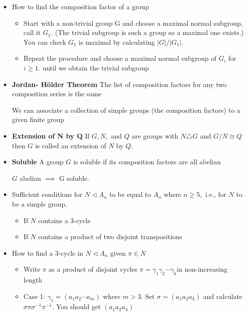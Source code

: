 \documentclass[a4paper, 12pt]
{article}
\begin{document}
\begin{itemize}
	\item How to find the composition factor of a group
	\begin{itemize}
		\item Start with a non-trivial group G and choose a maximal normal subgroup, call it $G_1.$ (The trivial subgroup is such a group so a maximal one exists.) You can check $G_1$ is maximal by calculating $|G|/|G_1|.$ 
		\item Repeat the procedure and choose a maximal normal subgroup of $G_i$ for $i \geq 1.$ until we obtain the trivial subgroup
	
	\end{itemize}
	
	\item \textbf{Jordan- Hölder Theorem}
	The list of composition factors for any two composition series is the same
	
	We can associate a collection of simple groups (the composition factors) to a given finite group
	
	\item \textbf{Extension of N by Q} If $G, N,$ and $Q$ are groups with $N \triangle G$ and $G/N \cong Q$ then $G$ is called an extension of $N$ by $Q.$ 

	
	\item \textbf{Soluble} A group $G$ is soluble if its composition factors are all abelian
	
	$G$ abelian $\implies$ G soluble.
	
	\item Sufficient conditions for $N \triangleleft A_n$ to be equal to $A_n$ where $n \geq 5,$ i.e., for $N$ to be a simple group.
	
	\begin{itemize}
		\item If $N$ contains a 3-cycle
		\item If $N$ contains a product of two disjoint transpositions
	\end{itemize}
	
	\item How to find a 3-cycle in $N \triangleleft A_n$ given $\pi \in N$
	
	\begin{itemize}
		\item Write $\pi$ as a product of disjoint cycles $\pi = \gamma_1 \gamma_2 \cdots\gamma_k $in non-increasing length
		
		\item Case 1:  $\gamma_1 = (a_1 a_2 \cdots a_m)$ where $m > 3$. Set $\sigma = (a_1 a_2 a_3)$ and calculate $\sigma \pi \sigma^{-1} \pi^{-1}$. You should get $(a_1 a_2 a_4)$
		

\end{itemize}
\end{itemize}
\end{document}
